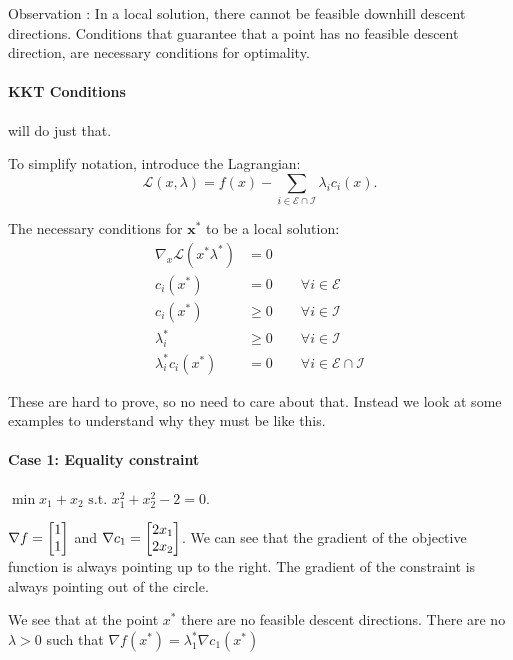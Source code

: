 \documentclass{article}
\begin{document}
\medskip
Observation : In a local solution, there cannot be feasible downhill descent directions. Conditions 
that guarantee that a point has no feasible descent direction, are necessary conditions for optimality. 

\paragraph{KKT Conditions} will do just that. 

\medskip To simplify notation, introduce the Lagrangian:
\[
  \mathcal{L}(x, \lambda) = f(x) - \sum_{i\in\mathcal{E}\cap\mathcal{I}} \lambda_i c_i(x)
.\] 

The necessary conditions for $\mathbf{x^*}$ to be a local solution:
\begin{align*}
  \nabla_{x}\mathcal{L}(x^*\lambda^*) &= 0 \\
  c_i(x^*) &= 0 \qquad \forall i\in \mathcal{E} \\
  c_i(x^*) &\geq 0 \qquad \forall i\in \mathcal{I} \\ 
  \lambda_i^* &\geq 0 \qquad \forall i\in \mathcal{I} \\
  \lambda_i^*c_i(x^*) &= 0 \qquad \forall i\in \mathcal{E} \cap\mathcal{I}
\end{align*}

These are hard to prove, so no need to care about that. Instead we look at some examples to understand why they must
be like this. 

\paragraph{Case 1: Equality constraint} $\min x_1 + x_2 \text{ s.t. } x_1^2 + x_2^2 - 2 = 0$. 

\begin{minipage}[c]{0.5\textwidth}
\end{minipage}
\begin{minipage}[c]{0.5\textwidth}
  $\nabla f = \begin{bmatrix} 1 \\ 1 \end{bmatrix}$ and $ \nabla c_1= \begin{bmatrix} 2x_1 \\ 2x_2 \end{bmatrix}$. We can see that the gradient of the objective function
  is always pointing up to the right. The gradient of the constraint is always pointing out of the circle. 
  
  \medskip
\end{minipage}

We see that at the point $x^*$ there are no feasible descent directions. There are no $\lambda > 0$ such that $\nabla f(x^*) = \lambda_1^*\nabla c_1(x^*)$ 
\end{document}
